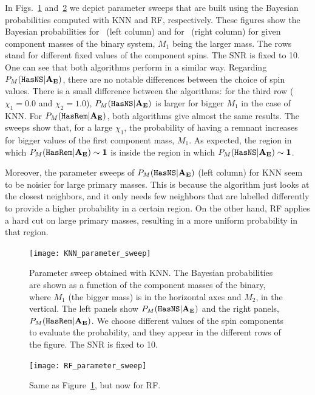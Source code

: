 In Figs.~\ref{fig:param_sweep_KNN} and~\ref{fig:param_sweep_RF} we depict parameter sweeps that are built using the Bayesian probabilities computed with \ac{KNN} and \ac{RF}, respectively.  These figures show the Bayesian probabilities for \hasns\ (left column) and for \hasrem\ (right column) for given component masses of the binary system, $M_1$ being the larger mass. The rows stand for different fixed values of the component spins. The SNR is fixed to 10. One can see that both algorithms perform in a similar way. Regarding $P_M({{\tt HasNS}} |\bf{A_E})$,  there are no notable differences between the choice of spin values.  There is a small difference between the algorithms: for the third row ($\chi_1 = 0.0$ and $\chi_2=1.0$), $P_M({{\tt HasNS}} |\bf{A_E})$ is larger for bigger $M_1$ in the case of \ac{KNN}. For $P_M({{\tt HasRem}} |\bf{A_E})$, both algorithms give almost the same results. The sweeps show that, for a large $\chi_1$, the probability of having a remnant increases for bigger values of the first component mass, $M_1$. As expected, the region in which $P_M({{\tt HasRem}} |\bf{A_E}) \sim 1$ is inside the region in which $P_M({{\tt HasNS}} |\bf{A_E}) \sim 1$.

Moreover, the parameter sweeps of $P_M({{\tt HasNS}} |\bf{A_E})$ (left column) for \ac{KNN} seem to be noisier for large primary masses. This is because the algorithm just looks at the closest neighbors, and it only needs few neighbors that are labelled differently to provide a higher probability in a certain region. On the other hand, \ac{RF} applies a hard cut on large primary masses, resulting in a more uniform probability in that region. 

\begin{figure}%
\texttt{[image: KNN\_parameter\_sweep]}
    \caption{Parameter sweep obtained with \ac{KNN}. The Bayesian probabilities are shown as a function of the component masses of the binary, where $M_1$ (the bigger mass) is in the horizontal axes and $M_2$, in the vertical. The left panels show $P_M({{\tt HasNS}} |\bf{A_E})$ and the right panels, $P_M({{\tt HasRem}} |\bf{A_E})$. We choose different values of the spin components to evaluate the probability, and they appear in the different rows of the figure.   The SNR is fixed to 10. }
\label{fig:param_sweep_KNN}
\end{figure}

\begin{figure}%
\texttt{[image: RF\_parameter\_sweep]}
 \caption{Same as Figure~\ref{fig:param_sweep_KNN}, but now for \ac{RF}.}
\label{fig:param_sweep_RF}
\end{figure}


